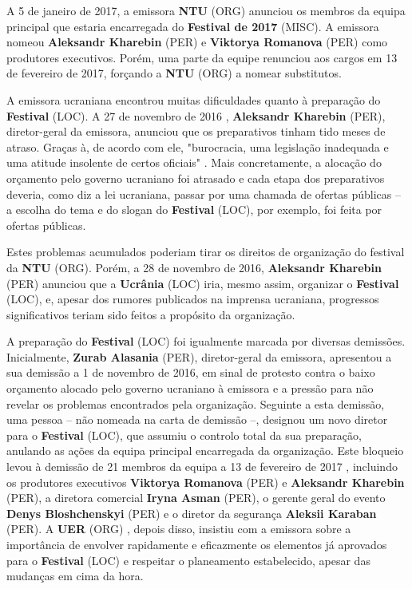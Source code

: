 \documentclass[12pt,a4paper]{article}
\begin{document}
A 5 de janeiro de 2017, a emissora \textbf{NTU} (ORG) anunciou os membros da equipa principal que estaria encarregada do \textbf{Festival de 2017} (MISC). A emissora nomeou \textbf{Aleksandr Kharebin} (PER) e \textbf{Viktorya Romanova} (PER) como produtores executivos. Porém, uma parte da equipe renunciou aos cargos em 13 de fevereiro de 2017, forçando a \textbf{NTU} (ORG) a nomear substitutos.

A emissora ucraniana encontrou muitas dificuldades quanto à preparação do \textbf{Festival} (LOC). A 27 de novembro de 2016 , \textbf{Aleksandr Kharebin} (PER), diretor-geral da emissora, anunciou que os preparativos tinham tido meses de atraso. Graças à, de acordo com ele, "burocracia, uma legislação inadequada e uma atitude insolente de certos oficiais" . Mais concretamente, a alocação do orçamento pelo governo ucraniano foi atrasado e cada etapa dos preparativos deveria, como diz a lei ucraniana, passar por uma chamada de ofertas públicas -- a escolha do tema e do slogan do \textbf{Festival} (LOC), por exemplo, foi feita por ofertas públicas.

Estes problemas acumulados poderiam tirar os direitos de organização do festival da \textbf{NTU} (ORG). Porém, a 28 de novembro de 2016, \textbf{Aleksandr Kharebin} (PER) anunciou que a \textbf{Ucrânia} (LOC) iria, mesmo assim, organizar o \textbf{Festival} (LOC), e, apesar dos rumores publicados na imprensa ucraniana, progressos significativos teriam sido feitos a propósito da organização.

A preparação do \textbf{Festival} (LOC) foi igualmente marcada por diversas demissões. Inicialmente, \textbf{Zurab Alasania} (PER), diretor-geral da emissora, apresentou a sua demissão a 1 de novembro de 2016, em sinal de protesto contra o baixo orçamento alocado pelo governo ucraniano à emissora e a pressão para não revelar os problemas encontrados pela organização. Seguinte a esta demissão, uma pessoa -- não nomeada na carta de demissão --, designou um novo diretor para o \textbf{Festival} (LOC), que assumiu o controlo total da sua preparação, anulando as ações da equipa principal encarregada da organização. Este bloqueio levou à demissão de 21 membros da equipa a 13 de fevereiro de 2017 , incluindo os produtores executivos \textbf{Viktorya Romanova} (PER) e \textbf{Aleksandr Kharebin} (PER), a diretora comercial \textbf{Iryna Asman} (PER), o gerente geral do evento \textbf{Denys Bloshchenskyi} (PER) e o diretor da segurança \textbf{Aleksii Karaban} (PER). A \textbf{UER} (ORG) , depois disso, insistiu com a emissora sobre a importância de envolver rapidamente e eficazmente os elementos já aprovados para o \textbf{Festival} (LOC) e respeitar o planeamento estabelecido, apesar das mudanças em cima da hora.
\end{document}
